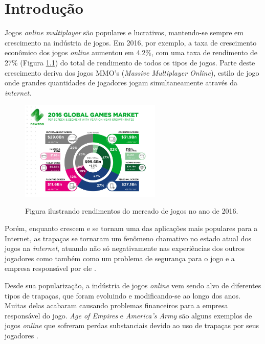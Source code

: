 \chapter{Introdução}

Jogos \textit{online multiplayer} são populares e lucrativos, mantendo-se sempre em crescimento
na indústria de jogos. Em 2016, por exemplo, a taxa de crescimento econômico dos jogos \textit{online} aumentou em 4.2\%, com uma taxa de rendimento de 27\% (Figura \ref{fig:games}) do total de rendimento de todos os tipos de jogos. Parte deste crescimento deriva dos jogos MMO's (\textit{Massive Multiplayer Online}), estilo de jogo onde grandes quantidades de jogadores jogam simultaneamente através da \textit{internet}.


\begin{figure}[h!]
	\begin{center}
		\includegraphics[width=0.6\textwidth]{imagens/1.jpg}
		\caption[Figura ilustrando rendimentos do mercado de jogos no ano de 2016.]{Figura ilustrando rendimentos do mercado de jogos no ano de 2016.}
		\label{fig:games}	
	\end{center}
\end{figure}

Porém, enquanto crescem e se tornam uma das aplicações mais populares para a Internet, as trapaças se tornaram um fenômeno chamativo no estado atual dos jogos na \textit{internet}, atuando não só negativamente nas experiências dos outros jogadores como também como um problema de segurança para o jogo e a empresa responsável por ele \cite{trends}. 


Desde sua popularização, a indústria de jogos \textit{online} vem sendo alvo de diferentes tipos de trapaças, que foram evoluindo e modificando-se ao longo dos anos. Muitas delas acabaram causando problemas financeiros para a empresa responsável do jogo. \textit{Age of Empires} e \textit{America’s Army} são alguns exemplos de jogos \textit{online} que sofreram
perdas substanciais devido ao uso de trapaças por seus jogadores \cite{cheatingonlinegames}. 
     
